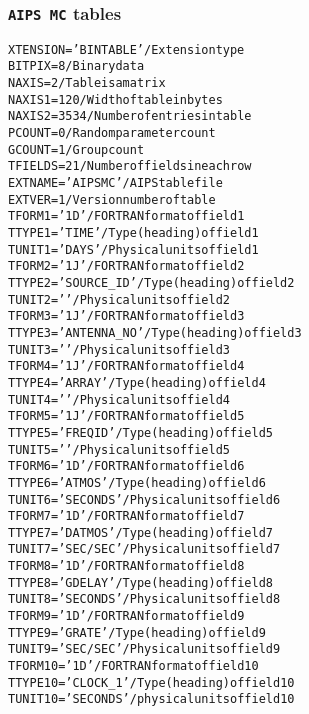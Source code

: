 \documentclass[twoside]{article}
\begin{document}
\subsubsection{{\tt AIPS MC} tables}
\label{Appe:MCtable}
\begin{alltt}
XTENSION= 'BINTABLE'           / Extension type
BITPIX  =                    8 / Binary data
NAXIS   =                    2 / Table is a matrix
NAXIS1  =                  120 / Width of table in bytes
NAXIS2  =                 3534 / Number of entries in table
PCOUNT  =                    0 / Random parameter count
GCOUNT  =                    1 / Group count
TFIELDS =                   21 / Number of fields in each row
EXTNAME = 'AIPS MC '           / AIPS table file
EXTVER  =                    1 / Version number of table
TFORM1  = '1D      '           / FORTRAN format of field  1
TTYPE1  = 'TIME            '   / Type (heading) of field  1
TUNIT1  = 'DAYS    '           / Physical units of field  1
TFORM2  = '1J      '           / FORTRAN format of field  2
TTYPE2  = 'SOURCE_ID       '   / Type (heading) of field  2
TUNIT2  = '        '           / Physical units of field  2
TFORM3  = '1J      '           / FORTRAN format of field  3
TTYPE3  = 'ANTENNA_NO      '   / Type (heading) of field  3
TUNIT3  = '        '           / Physical units of field  3
TFORM4  = '1J      '           / FORTRAN format of field  4
TTYPE4  = 'ARRAY           '   / Type (heading) of field  4
TUNIT4  = '        '           / Physical units of field  4
TFORM5  = '1J      '           / FORTRAN format of field  5
TTYPE5  = 'FREQID          '   / Type (heading) of field  5
TUNIT5  = '        '           / Physical units of field  5
TFORM6  = '1D      '           / FORTRAN format of field  6
TTYPE6  = 'ATMOS           '   / Type (heading) of field  6
TUNIT6  = 'SECONDS '           / Physical units of field  6
TFORM7  = '1D      '           / FORTRAN format of field  7
TTYPE7  = 'DATMOS          '   / Type (heading) of field  7
TUNIT7  = 'SEC/SEC '           / Physical units of field  7
TFORM8  = '1D      '           / FORTRAN format of field  8
TTYPE8  = 'GDELAY          '   / Type (heading) of field  8
TUNIT8  = 'SECONDS '           / Physical units of field  8
TFORM9  = '1D      '           / FORTRAN format of field  9
TTYPE9  = 'GRATE           '   / Type (heading) of field  9
TUNIT9  = 'SEC/SEC '           / Physical units of field  9
TFORM10 = '1D      '           / FORTRAN format of field 10
TTYPE10 = 'CLOCK_1         '   / Type (heading) of field 10
TUNIT10 = 'SECONDS '           / physical units of field 10

\end{alltt}
\end{document}
